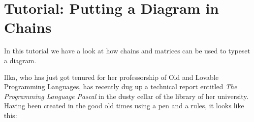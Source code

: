 %
%
%


\section{Tutorial: Putting a Diagram in Chains}

In this tutorial we have a look at how chains and matrices can be used
to typeset a diagram.

Ilka, who has just got tenured for her professorship of Old and
Lovable Programming Languages, has recently dug up a technical report entitled
\emph{The Programming Language Pascal} in the dusty cellar of the
library of her university. Having been created in the good old times
using a pen and a rules, it looks like this:

